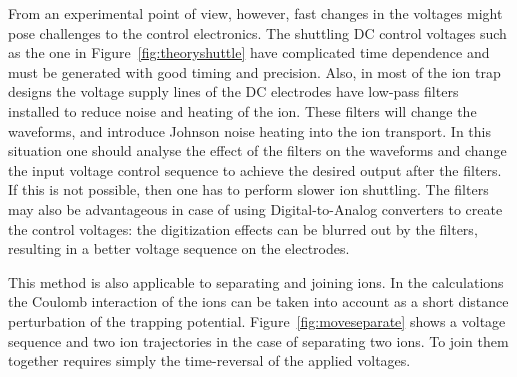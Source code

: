 From an experimental point of view, however, fast changes in the voltages might pose challenges to the control electronics. The shuttling DC control voltages such as the one in Figure~\ref{fig:theoryshuttle} have complicated time dependence and must be generated with good timing and precision.
Also, in most of the ion trap designs the voltage supply lines of the DC electrodes have low-pass filters installed to reduce noise and heating of the ion. These filters will change the waveforms, and introduce Johnson noise heating into the ion transport. In this situation one should analyse the effect of the filters on the waveforms and change the input voltage control sequence to achieve the desired output after the filters. If this is not possible, then one has to perform slower ion shuttling. The filters may also be advantageous in case of using Digital-to-Analog converters to create the control voltages: the digitization effects can be blurred out by the filters, resulting in a better voltage sequence on the electrodes.

This method is also applicable to separating and joining ions. In the calculations the Coulomb interaction of the ions can be taken into account as a short distance perturbation of the trapping potential. Figure~\ref{fig:moveseparate} shows a voltage sequence and two ion trajectories in the case of separating two ions. To join them together requires simply the time-reversal of the applied voltages. 

